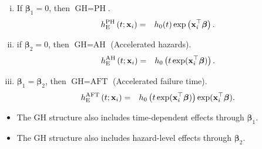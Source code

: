 \documentclass[10pt,handout,compress]{beamer}
\newcommand{\bbeta}{\bm{\beta}}
\newcommand{\bx}{{\bf x}}
\begin{document}
\begin{frame}
\begin{enumerate}[(i)]
\item If  $\bbeta_1=0$, then $\text{GH}=\text{PH}$.
\begin{eqnarray}\label{PH}
h_{\text{E}}^{\text{PH}}\left(t;\bx_i\right) &=& h_0(t)\exp\left(\bx_i^{\top}\bbeta\right).
\end{eqnarray}
\pause
\item if $\bbeta_2=0$, then $\text{GH}=\text{AH}$ (Accelerated hazards).
\begin{eqnarray}\label{AH}
h_{\text{E}}^{\text{AH}}\left(t;\bx_i\right) &=& h_0\left(t \exp(\bx_i^{\top}\bbeta)\right).
\end{eqnarray}
\pause
\item $\bbeta_1=\bbeta_2$, then $\text{GH}=\text{AFT}$ (Accelerated failure time).
\begin{eqnarray}\label{AFT}
h_{\text{E}}^{\text{AFT}}\left(t;\bx_i\right) &=& h_0\left(t \exp(\bx_i^{\top}\bbeta)\right)\exp(\bx_i^{\top}\bbeta).
\end{eqnarray}
\end{enumerate}
\end{frame}


\begin{frame}
\begin{itemize}
\item The GH structure also includes time-dependent effects through $\bbeta_1$.
\begin{center}
\end{center}
\end{itemize}
\end{frame}


\begin{frame}
\begin{itemize}
\item The GH structure also includes hazard-level effects through $\bbeta_2$.
\begin{center}
\end{center}
\end{itemize}
\end{frame}
\end{document}
